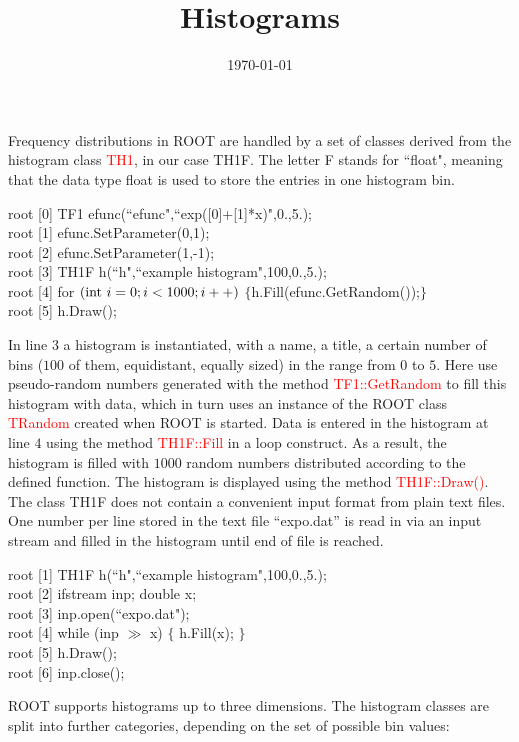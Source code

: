 \documentclass[12pt,a4paper]{article}
\title{Histograms}
\author{}
\date{\today}
\begin{document}
\maketitle

Frequency distributions in ROOT are handled by a set of classes derived from the histogram class \textcolor{red}{TH1}, in our case TH1F. The letter F stands for ``float", meaning that the data type float is used to store the entries in one histogram bin.

root [0] TF1 efunc(``efunc",``exp([0]+[1]*x)",0.,5.); \\
root [1] efunc.SetParameter(0,1); \\
root [2] efunc.SetParameter(1,-1); \\
root [3] TH1F h(``h",``example histogram",100,0.,5.); \\
root [4] for $({\rm int}~ i=0;i<1000;i++)$ $\{$h.Fill(efunc.GetRandom());$\}$ \\
root [5] h.Draw();

In line $3$ a histogram is instantiated, with a name, a title, a certain number of bins ($100$ of them, equidistant, equally sized) in the range from $0$ to $5$. Here use pseudo-random numbers generated with the method \textcolor{red}{TF1::GetRandom} to fill this histogram with data, which in turn uses an instance of the ROOT class \textcolor{red}{TRandom} created when ROOT is started. Data is entered in the histogram at line $4$ using the method \textcolor{red}{TH1F::Fill} in a loop construct. As a result, the histogram is filled with $1000$ random numbers distributed according to the defined function. The histogram is displayed using the method \textcolor{red}{TH1F::Draw()}. The class TH1F does not contain a convenient input format from plain text files. One number per line stored in the text file “expo.dat” is read in via an input stream and filled in the histogram until end of file is reached.


root [1] TH1F h(``h",``example histogram",100,0.,5.); \\
root [2] ifstream inp; double x; \\
root [3] inp.open(``expo.dat"); \\
root [4] while (inp $\gg$ x) $\{$ h.Fill(x); $\}$ \\
root [5] h.Draw(); \\
root [6] inp.close();


ROOT supports histograms up to three dimensions. The histogram classes are split into further categories, depending on the set of possible bin values:
\end{document}

